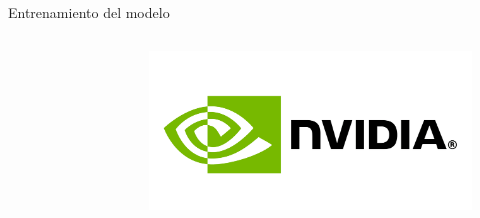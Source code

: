 \documentclass[12pt,aspectratio=169]{beamer}
\begin{document}
\begin{frame}{Entrenamiento del modelo}
\begin{columns}[c]
\begin{figure}
            \end{figure}
            \vspace*{-7mm}
            \begin{figure}
                \includegraphics[scale=0.06]{figs/nvidia.png}
            \end{figure}
    \end{columns}

\end{frame}
\end{document}
